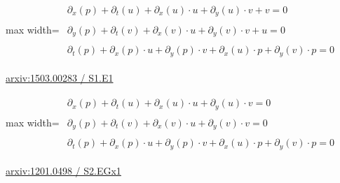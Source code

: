 \documentclass[10pt,a4paper]{article}
\begin{document}
\begin{minipage}{\linewidth}
\begin{center}\begin{adjustbox}{max width=\linewidth}$\displaystyle\begin{gathered}\begin{gathered}\partial_{x}(p)+\partial_{t}(u)+\partial_{x}(u)\cdot u+\partial_{y}(u)\cdot v+v=0\end{gathered}\\[5pt]\begin{gathered}\partial_{y}(p)+\partial_{t}(v)+\partial_{x}(v)\cdot u+\partial_{y}(v)\cdot v+u=0\end{gathered}\\[5pt]\begin{gathered}\partial_{t}(p)+\partial_{x}(p)\cdot u+\partial_{y}(p)\cdot v+\partial_{x}(u)\cdot p+\partial_{y}(v)\cdot p=0\end{gathered}\end{gathered}$\end{adjustbox}\end{center}
{\small \href{https://arxiv.org/html/1503.00283#S1.E1}{arxiv:1503.00283 / S1.E1}}\par
\end{minipage}\par\vspace{7mm}

\begin{minipage}{\linewidth}
\begin{center}\begin{adjustbox}{max width=\linewidth}$\displaystyle\begin{gathered}\begin{gathered}\partial_{x}(p)+\partial_{t}(u)+\partial_{x}(u)\cdot u+\partial_{y}(u)\cdot v=0\end{gathered}\\[5pt]\begin{gathered}\partial_{y}(p)+\partial_{t}(v)+\partial_{x}(v)\cdot u+\partial_{y}(v)\cdot v=0\end{gathered}\\[5pt]\begin{gathered}\partial_{t}(p)+\partial_{x}(p)\cdot u+\partial_{y}(p)\cdot v+\partial_{x}(u)\cdot p+\partial_{y}(v)\cdot p=0\end{gathered}\end{gathered}$\end{adjustbox}\end{center}
{\small \href{https://arxiv.org/html/1201.0498#S2.EGx1}{arxiv:1201.0498 / S2.EGx1}}\par
\end{minipage}\par\vspace{7mm}
\end{document}

